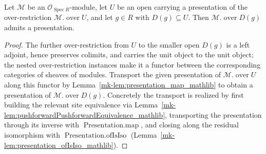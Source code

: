 \begin{lemma}\label{mk-lem:presentation_over_basicOpen}
  \leanok

  Let \(\mathcal{M}\) be an \(\mathcal{O}_{\operatorname{Spec} R}\)-module, let \(U\) be an open
  carrying a presentation of the over-restriction \(\mathcal{M}.\operatorname{over} U\), and let
  \(g \in R\) with \(D(g) \subseteq U\). Then \(\mathcal{M}.\operatorname{over} D(g)\) admits a
  presentation.
\end{lemma}
\begin{proof}
  \leanok
  The further over-restriction from \(U\) to the smaller open \(D(g)\) is a left adjoint, hence
  preserves colimits, and carries the unit object to the unit object; the nested over-restriction
  instances make it a functor between the corresponding categories of sheaves of modules. Transport the
  given presentation of \(\mathcal{M}.\operatorname{over} U\) along this functor by
  Lemma~\ref{mk-lem:presentation_map_mathlib} to obtain a presentation of
  \(\mathcal{M}.\operatorname{over} D(g)\). Concretely the transport is realized by first building the
  relevant site equivalence via Lemma~\ref{mk-lem:pushforwardPushforwardEquivalence_mathlib}, transporting
  the presentation through its inverse with \(\operatorname{Presentation.map}\), and closing along the
  residual isomorphism with \(\operatorname{Presentation.ofIsIso}\)
  (Lemma~\ref{mk-lem:presentation_ofIsIso_mathlib}).
\end{proof}

